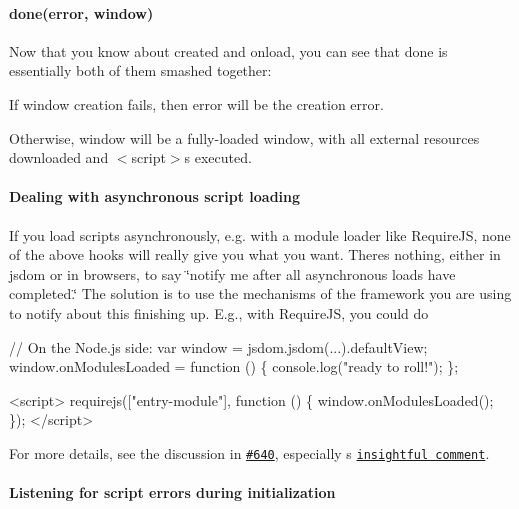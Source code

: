 \paragraph*{{\ttfamily done(error, window)}}

Now that you know about {\ttfamily created} and {\ttfamily onload}, you can see that {\ttfamily done} is essentially both of them smashed together\+:


\begin{DoxyItemize}
\item If window creation fails, then {\ttfamily error} will be the creation error.
\item Otherwise, {\ttfamily window} will be a fully-\/loaded window, with all external resources downloaded and {\ttfamily $<$script$>$}s executed.
\end{DoxyItemize}

\paragraph*{Dealing with asynchronous script loading}

If you load scripts asynchronously, e.\+g. with a module loader like Require\+JS, none of the above hooks will really give you what you want. There\textquotesingle{}s nothing, either in jsdom or in browsers, to say \char`\"{}notify me after all asynchronous loads have completed.\char`\"{} The solution is to use the mechanisms of the framework you are using to notify about this finishing up. E.\+g., with Require\+JS, you could do


\begin{DoxyCode}
// On the Node.js side:
var window = jsdom.jsdom(...).defaultView;
window.onModulesLoaded = function () \{
  console.log("ready to roll!");
\};
\end{DoxyCode}



\begin{DoxyCode}
<script>
requirejs(["entry-module"], function () \{
  window.onModulesLoaded();
\});
</script>
\end{DoxyCode}


For more details, see the discussion in \href{https://github.com/tmpvar/jsdom/issues/640}{\tt \#640}, especially \href{https://github.com/matthewkastor}{\tt }\textquotesingle{}s \href{https://github.com/tmpvar/jsdom/issues/640#issuecomment-22216965}{\tt insightful comment}.

\paragraph*{Listening for script errors during initialization}

